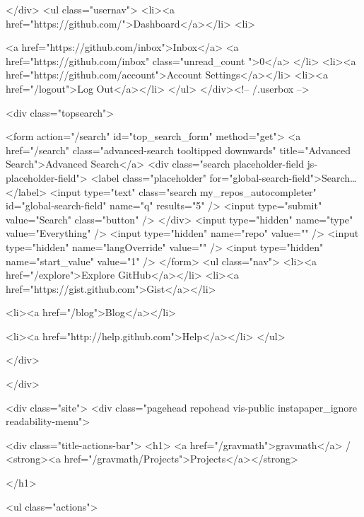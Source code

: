         
        
      </div>
      <ul class="usernav">
        <li><a href="https://github.com/">Dashboard</a></li>
        <li>
          
          <a href="https://github.com/inbox">Inbox</a>
          <a href="https://github.com/inbox" class="unread_count ">0</a>
        </li>
        <li><a href="https://github.com/account">Account Settings</a></li>
        <li><a href="/logout">Log Out</a></li>
      </ul>
    </div><!-- /.userbox -->
  


        
        <div class="topsearch">
  
    <form action="/search" id="top_search_form" method="get">
      <a href="/search" class="advanced-search tooltipped downwards" title="Advanced Search">Advanced Search</a>
      <div class="search placeholder-field js-placeholder-field">
        <label class="placeholder" for="global-search-field">Search…</label>
        <input type="text" class="search my_repos_autocompleter" id="global-search-field" name="q" results="5" /> <input type="submit" value="Search" class="button" />
      </div>
      <input type="hidden" name="type" value="Everything" />
      <input type="hidden" name="repo" value="" />
      <input type="hidden" name="langOverride" value="" />
      <input type="hidden" name="start_value" value="1" />
    </form>
    <ul class="nav">
      <li><a href="/explore">Explore GitHub</a></li>
      <li><a href="https://gist.github.com">Gist</a></li>
      
      <li><a href="/blog">Blog</a></li>
      
      <li><a href="http://help.github.com">Help</a></li>
    </ul>
  
</div>

      </div>

      
      
        
    <div class="site">
      <div class="pagehead repohead vis-public    instapaper_ignore readability-menu">

      

      <div class="title-actions-bar">
        <h1>
          <a href="/gravmath">gravmath</a> / <strong><a href="/gravmath/Projects">Projects</a></strong>
          
          
        </h1>

        
    <ul class="actions">
      

